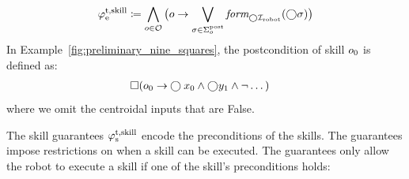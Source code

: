 \documentclass[letterpaper, 10 pt, conference]{ieeeconf}
\begin{document}
\begin{equation}\label{eq:env_trans}
\begin{aligned}
    \varphi_\textrm{e}^\textrm{t,skill} \coloneqq \bigwedge_{o \in \mathcal{O}} \big( o 
    \to
    \bigvee_{\sigma\in\Sigma_{o}^{\textrm{post}}} \textit{form}_{\bigcirc{\mathcal I}_{\textrm{robot}}}(\bigcirc\sigma) \big)
\end{aligned}
\end{equation}
%
In Example~\ref{fig:preliminary_nine_squares},
the postcondition of skill $o_{0}$
is defined as:
\begin{equation}\label{eq:skill_0_post}
\begin{aligned}
     \square (o_{0} 
    \to &\bigcirc x_0 \land \bigcirc y_1 \land \neg \dots)
\end{aligned}
\end{equation}
where we omit the centroidal inputs that are False.

The skill guarantees $\varphi_\textrm{s}^\textrm{t,skill}$ encode the preconditions of the skills.
The guarantees impose restrictions on when a skill can be executed.
The guarantees only allow the robot to execute a skill 
if one of the skill's preconditions holds:
\end{document}

